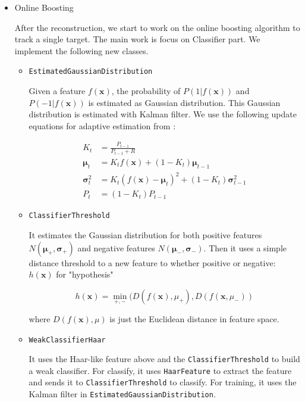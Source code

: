 \documentclass[a4paper]{article}
\begin{document}
\begin{enumerate}
\begin{itemize}
\item Online Boosting

After the reconstruction, we start to work on the online boosting algorithm to track a single target. The main work is focus on Classifier part. We implement the following new classes.

\begin{itemize}

\item \lstinline{EstimatedGaussianDistribution}

Given a feature $f(\mathbf{x})$, the probability of $P(1|f(\mathbf{x}))$ and $P(-1|f(\mathbf{x}))$ is estimated as Gaussian distribution\cite{Grabner:2006:OBV:1153170.1153451}. This Gaussian distribution is estimated with Kalman filter\cite{Welch:1995:IKF:897831}. We use the following update equations for adaptive estimation from \cite{Grabner:2006:OBV:1153170.1153451}:

\begin{subequations}
\begin{align}
K_{t}&=\frac{P_{t-1}}{P_{t-1}+R}\\
\mathbf{\mu}_{t}&=K_{t}f(\mathbf{x})+(1-K_{t})\mathbf{\mu}_{t-1}\\
\mathbf{\sigma}_{t}^{2}&=K_{t}(f(\mathbf{x})-\mathbf{\mu}_{t})^{2}+(1-K_{t})\mathbf{\sigma}_{t-1}^{2}\\
P_{t}&=(1-K_{t})P_{t-1}
\end{align}
\end{subequations}

\item \lstinline{ClassifierThreshold}

It estimates the Gaussian distribution for both positive features $N(\mathbf{\mu_{+}}, \mathbf{\sigma_{+}})$ and negative features $N(\mathbf{\mu_{-}}, \mathbf{\sigma_{-}})$. Then it uses a simple distance threshold to a new feature to whether positive or negative: $h(\mathbf{x})$ for "hypothesis"

\begin{equation}
h(\mathbf{x})=\min_{+, -}(D(f(\mathbf{x}), \mu_{+}), D(f(\mathbf{x}, \mu_{-}))
\end{equation}

where $D(f(\mathbf{x}), \mu)$ is just the Euclidean distance in feature space.

\item \lstinline{WeakClassifierHaar}

It uses the Haar-like feature above and the \lstinline{ClassifierThreshold} to build a weak classifier. For classify, it uses \lstinline{HaarFeature} to extract the feature and sends it to \lstinline{ClassifierThreshold} to classify. For training, it uses the Kalman filter in \lstinline{EstimatedGaussianDistribution}.


\end{itemize}
\end{itemize}
\end{enumerate}
\end{document}
